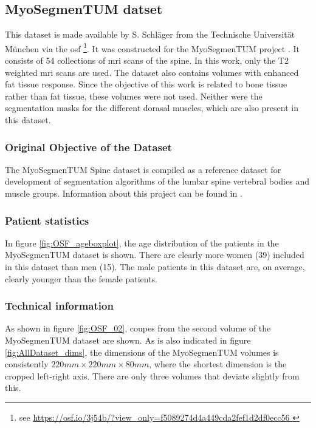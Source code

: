\subsection{MyoSegmenTUM datset}

This dataset is made available by S. Schläger from the Technische Universität München via the \acrfull{osf} \footnote{see \url{ https://osf.io/3j54b/?view_only=f5089274d4a449cda2fef1d2df0ecc56 }}.
It was constructed for the MyoSegmenTUM project \cite{Durian2019}.
It consists of 54 collections of \acrshort{mri} scans of the spine.
In this work, only the T2 weighted \acrlong{mri} scans are used.
The dataset also contains volumes with enhanced fat tissue response. Since the objective of this work is related to bone tissue rather than fat tissue, these volumes were not used.
Neither were the segmentation masks for the different dorasal muscles, which are also present in this dataset.

\subsubsection{Original Objective of the Dataset}

The MyoSegmenTUM Spine dataset is compiled as a reference dataset for development of segmentation algorithms of the lumbar spine vertebral bodies and  muscle groups.
Information about this project can be found in \cite{Durian2019}.

\subsubsection{Patient statistics}

In figure \ref{fig:OSF_ageboxplot}, the age distribution of the patients in the MyoSegmenTUM dataset is shown.
There are clearly more women (39) included in this dataset than men (15).
The male patients in this dataset are, on average, clearly younger than the female patients.



\subsubsection{Technical information}

As shown in figure \ref{fig:OSF_02}, coupes from the second volume of the MyoSegmenTUM dataset are shown.
As is also indicated in figure \ref{fig:AllDataset_dims}, the dimensions of the MyoSegmenTUM volumes is consistently $220 mm \times 220 mm \times 80 mm$, where the shortest dimension is the cropped left-right axis.
There are only three volumes that deviate slightly from this.

